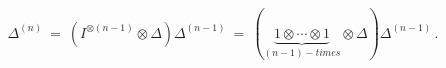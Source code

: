 \begin{equation}\Delta^{(n)} \ = \
(I^{\otimes (n-1)}\otimes \Delta ) \Delta^{(n-1)} \ = \
(\underbrace{1\otimes\cdots\otimes1}_{(n-1)-times}\otimes \Delta)
\Delta^{(n-1)}\,
.\label{410}\end{equation}\
